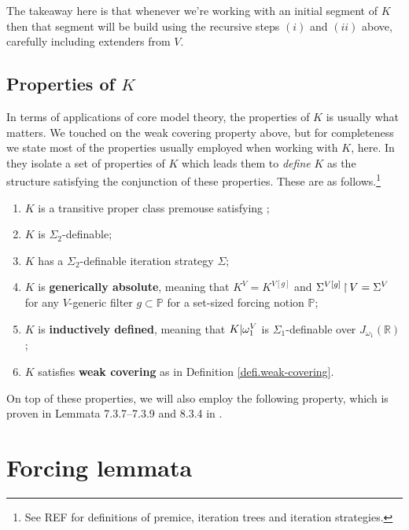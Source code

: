 \documentclass[../../main]{subfiles}
\begin{document}
\qquad The takeaway here is that whenever we're working with an initial segment of $K$ then that segment will be build using the recursive steps $(i)$ and $(ii)$ above, carefully including extenders from $V$.

\subsection{Properties of $K$}

In terms of applications of core model theory, the properties of $K$ is usually what matters. We touched on the weak covering property above, but for completeness we state most of the properties usually employed when working with $K$, here. In \cite{Kwithoutmeasurable} they isolate a set of properties of $K$ which leads them to \textit{define} $K$ as the structure satisfying the conjunction of these properties. These are as follows.\footnote{See REF for definitions of premice, iteration trees and iteration strategies.}

\begin{enumerate}
  \item $K$ is a transitive proper class premouse satisfying \zfc;
  \item $K$ is $\Sigma_2$-definable;
  \item $K$ has a $\Sigma_2$-definable iteration strategy $\Sigma$;
  \item $K$ is \textbf{generically absolute}, meaning that $K^V=K^{V[g]}$ and $\Sigma^{V[g]}\operatorname{\upharpoonright} V=\Sigma^V$ for any $V$-generic filter $g\subset\mathbb P$ for a set-sized forcing notion $\mathbb P$;
  \item $K$ is \textbf{inductively defined}, meaning that $K|\omega_1^V$ is $\Sigma_1$-definable over $J_{\omega_1}(\mathbb R)$;
  \item $K$ satisfies \textbf{weak covering} as in Definition \ref{defi.weak-covering}.\\
\end{enumerate}

On top of these properties, we will also employ the following property, which is proven in Lemmata 7.3.7--7.3.9 and 8.3.4 in \cite{Zeman}.



\section{Forcing lemmata}
\label{prelims.forcing}
\end{document}
